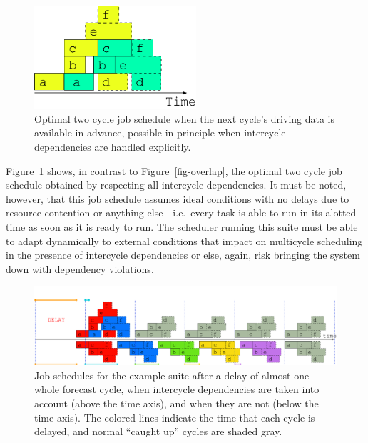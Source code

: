 \documentclass[11pt,a4paper]{article}
\begin{document}
\begin{figure}
    \begin{center}
        \includegraphics[width=6cm]{inkscape-svg/timeline-two-cycles-optimal} 
    \end{center}
    \caption[Optimal two-cycle job schedule]{\small Optimal two cycle
    job schedule when the next cycle's driving data is available in
    advance, possible in principle when intercycle dependencies are
    handled explicitly.} 
    \label{fig-optimal-two}
\end{figure} 

Figure~\ref{fig-optimal-two} shows, in contrast to
Figure~\ref{fig-overlap}, the optimal two cycle job schedule obtained by
respecting all intercycle dependencies. It must be noted, however, that
this job schedule assumes ideal conditions with no delays due to
resource contention or anything else - i.e.\ every task is able to run
in its alotted time as soon as it is ready to run. The scheduler running
this suite must be able to adapt dynamically to external conditions 
that impact on multicycle scheduling in the presence of
intercycle dependencies or else, again, risk bringing the system down
with dependency violations.

\begin{figure}
    \begin{center}
        \includegraphics[width=12cm]{inkscape-svg/timeline-three} 
    \end{center}
    \caption[Post delay comparison of job schedules]{\small Job
    schedules for the example suite after a delay of almost one whole
    forecast cycle, when intercycle dependencies are
    taken into account (above the time axis), and when they are not
    (below the time axis). The colored lines indicate the time that
    each cycle is delayed, and normal ``caught up'' cycles
    are shaded gray.} 
    \label{fig-time-three}
\end{figure} 
\end{document}
